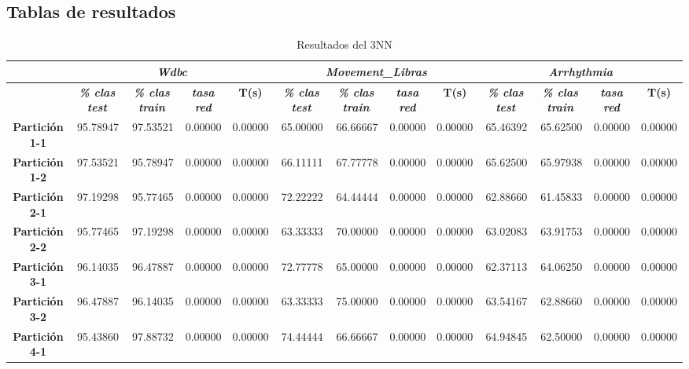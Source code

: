 \documentclass[a4paper,11pt]{article}
\begin{document}
 \subsection{Tablas de resultados}
  \begin{table}[H]	
  \caption{Resultados del 3NN}
  \begin{adjustbox}{width=1.1\textwidth}
  \begin{tabular}{|c|r|r|r|r|r|r|r|r|r|r|r|r|}
  \hline
  \multicolumn{1}{|l|}{} & \multicolumn{ 4}{c|}{\textbf{\textit{Wdbc}}} & \multicolumn{ 4}{c|}{\textbf{\textit{Movement\_Libras}}} & \multicolumn{ 4}{c|}{\textbf{\textit{Arrhythmia}}} \\ \hline
  & \multicolumn{1}{c|}{\textbf{\textit{\% clas test}}} & \multicolumn{1}{c|}{\textbf{\textit{\% clas train}}} & \multicolumn{1}{c|}{\textbf{\textit{tasa red}}} & \multicolumn{1}{c|}{\textbf{T(s)}} & \multicolumn{1}{c|}{\textbf{\textit{\% clas test}}} & \multicolumn{1}{c|}{\textbf{\textit{\% clas train}}} & \multicolumn{1}{c|}{\textbf{\textit{tasa red}}} & \multicolumn{1}{c|}{\textbf{T(s)}} & \multicolumn{1}{c|}{\textbf{\textit{\% clas test}}} & \multicolumn{1}{c|}{\textbf{\textit{\% clas train}}} & \multicolumn{1}{c|}{\textbf{\textit{tasa red}}} & \multicolumn{1}{c|}{\textbf{T(s)}} \\ \hline
  \textbf{Partición 1-1} & 95.78947 & 97.53521 & 0.00000 & 0.00000 & 65.00000 & 66.66667 & 0.00000 & 0.00000 & 65.46392 & 65.62500 & 0.00000 & 0.00000 \\ \hline
  \textbf{Partición 1-2} & 97.53521 & 95.78947 & 0.00000 & 0.00000 & 66.11111 & 67.77778 & 0.00000 & 0.00000 & 65.62500 & 65.97938 & 0.00000 & 0.00000 \\ \hline
  \textbf{Partición 2-1} & 97.19298 & 95.77465 & 0.00000 & 0.00000 & 72.22222 & 64.44444 & 0.00000 & 0.00000 & 62.88660 & 61.45833 & 0.00000 & 0.00000 \\ \hline
  \textbf{Partición 2-2} & 95.77465 & 97.19298 & 0.00000 & 0.00000 & 63.33333 & 70.00000 & 0.00000 & 0.00000 & 63.02083 & 63.91753 & 0.00000 & 0.00000 \\ \hline
  \textbf{Partición 3-1} & 96.14035 & 96.47887 & 0.00000 & 0.00000 & 72.77778 & 65.00000 & 0.00000 & 0.00000 & 62.37113 & 64.06250 & 0.00000 & 0.00000 \\ \hline
  \textbf{Partición 3-2} & 96.47887 & 96.14035 & 0.00000 & 0.00000 & 63.33333 & 75.00000 & 0.00000 & 0.00000 & 63.54167 & 62.88660 & 0.00000 & 0.00000 \\ \hline
  \textbf{Partición 4-1} & 95.43860 & 97.88732 & 0.00000 & 0.00000 & 74.44444 & 66.66667 & 0.00000 & 0.00000 & 64.94845 & 62.50000 & 0.00000 & 0.00000 \\ \hline

\end{tabular}
\end{adjustbox}
\end{table}
\end{document}
